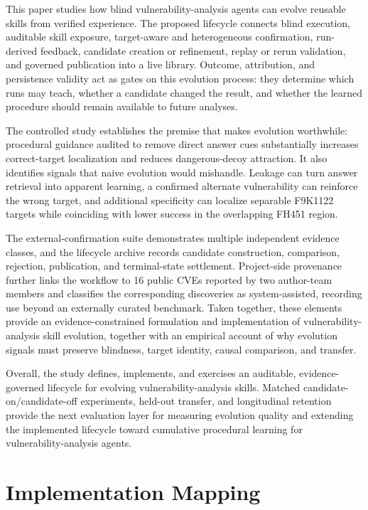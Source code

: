 \documentclass[11pt]{article}
\begin{document}
This paper studies how blind vulnerability-analysis agents can evolve reusable skills
from verified experience.  The proposed lifecycle connects blind execution, auditable
skill exposure, target-aware and heterogeneous confirmation, run-derived feedback,
candidate creation or refinement, replay or rerun validation, and governed publication
into a live library.  Outcome, attribution, and persistence validity act as gates on this
evolution process: they determine which runs may teach, whether a candidate changed the
result, and whether the learned procedure should remain available to future analyses.

The controlled study establishes the premise that makes evolution worthwhile:
procedural guidance audited to remove direct answer cues substantially increases correct-target localization
and reduces dangerous-decoy attraction.  It also identifies signals that naive evolution
would mishandle.  Leakage can turn answer retrieval into apparent learning, a confirmed
alternate vulnerability can reinforce the wrong target, and additional specificity can
localize separable F9K1122 targets while coinciding with lower success in the overlapping
FH451 region.

The external-confirmation suite demonstrates multiple independent evidence classes, and
the lifecycle archive records candidate construction, comparison, rejection,
publication, and terminal-state settlement.  Project-side provenance further links the
workflow to 16 public CVEs reported by two author-team members and classifies the
corresponding discoveries as system-assisted, recording use beyond an externally curated
benchmark.  Taken together, these
elements provide an evidence-constrained formulation and implementation of vulnerability-analysis skill
evolution, together with an empirical account of why evolution signals must preserve
blindness, target identity, causal comparison, and transfer.

Overall, the study defines, implements, and exercises an auditable, evidence-governed
lifecycle for evolving vulnerability-analysis skills.  Matched candidate-on/candidate-off
experiments, held-out transfer, and longitudinal retention provide the next evaluation
layer for measuring evolution quality and extending the implemented lifecycle toward
cumulative procedural learning for vulnerability-analysis agents.

\appendix
\section{Implementation Mapping}
\label{app:implementation}
\end{document}
